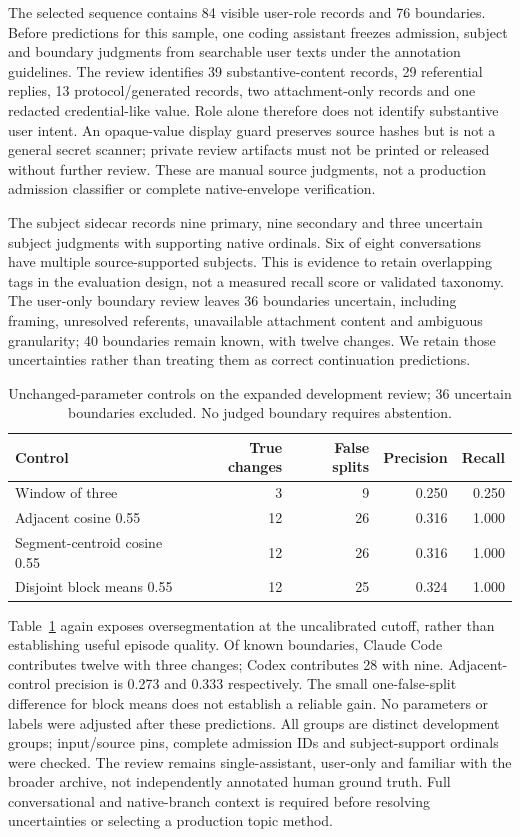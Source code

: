 \documentclass[11pt]{article}
\begin{document}
The selected sequence contains 84 visible user-role records and 76 boundaries.
Before predictions for this sample, one coding assistant freezes admission,
subject and boundary judgments from searchable user texts under the annotation
guidelines. The review identifies 39 substantive-content records, 29 referential
replies, 13 protocol/generated records, two attachment-only records and one
redacted credential-like value. Role alone therefore does not identify substantive
user intent. An opaque-value display guard preserves source hashes but is not a
general secret scanner; private review artifacts must not be printed or released
without further review. These are manual source judgments, not a production
admission classifier or complete native-envelope verification.

The subject sidecar records nine primary, nine secondary and three uncertain
subject judgments with supporting native ordinals. Six of eight conversations
have multiple source-supported subjects. This is evidence to retain overlapping
tags in the evaluation design, not a measured recall score or validated taxonomy.
The user-only boundary review leaves 36 boundaries uncertain, including framing,
unresolved referents, unavailable attachment content and ambiguous granularity;
40 boundaries remain known, with twelve changes. We retain those uncertainties
rather than treating them as correct continuation predictions.

\begin{table}[ht]
\centering
\begin{tabular}{lrrrr}
\toprule
Control & True changes & False splits & Precision & Recall\\
\midrule
Window of three &3&9&0.250&0.250\\
Adjacent cosine 0.55 &12&26&0.316&1.000\\
Segment-centroid cosine 0.55 &12&26&0.316&1.000\\
Disjoint block means 0.55 &12&25&0.324&1.000\\
\bottomrule
\end{tabular}
\caption{Unchanged-parameter controls on the expanded development review;
36 uncertain boundaries excluded. No judged boundary requires abstention.}
\label{tab:expanded}
\end{table}

Table~\ref{tab:expanded} again exposes oversegmentation at the uncalibrated
cutoff, rather than establishing useful episode quality. Of known boundaries,
Claude Code contributes twelve with three changes; Codex contributes 28 with
nine. Adjacent-control precision is 0.273 and 0.333 respectively. The small
one-false-split difference for block means does not establish a reliable gain.
No parameters or labels were adjusted after these predictions.
All groups are distinct development groups; input/source pins, complete admission
IDs and subject-support ordinals were checked. The review remains single-assistant,
user-only and familiar with the broader archive, not independently annotated
human ground truth. Full conversational and native-branch context is required
before resolving uncertainties or selecting a production topic method.
\end{document}
